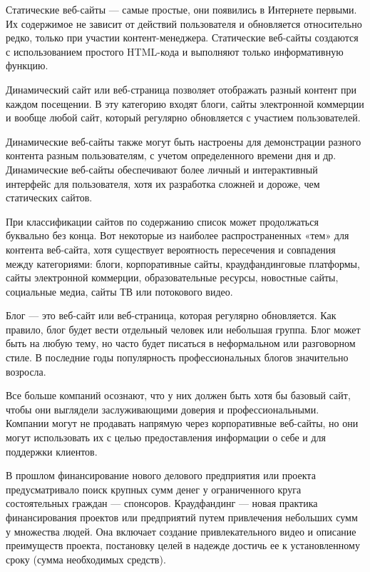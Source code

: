 Статические веб-сайты — самые простые, они появились в Интернете первыми.
Их содержимое не зависит от действий пользователя и обновляется относительно редко, только при участии контент-менеджера.
Статические веб-сайты создаются с использованием простого HTML-кода и выполняют только информативную функцию.

Динамический сайт или веб-страница позволяет отображать разный контент при каждом посещении.
В эту категорию входят блоги, сайты электронной коммерции и вообще любой сайт, который регулярно обновляется с участием пользователей.

Динамические веб-сайты также могут быть настроены для демонстрации разного контента разным пользователям, с учетом определенного времени дня и др.
Динамические веб-сайты обеспечивают более личный и интерактивный интерфейс для пользователя, хотя их разработка сложней и дороже, чем статических сайтов.


При классификации сайтов по содержанию список может продолжаться буквально без конца.
Вот некоторые из наиболее распространенных «тем» для контента веб-сайта, хотя существует вероятность пересечения и совпадения между категориями: блоги, корпоративные сайты, краудфандинговые платформы, сайты электронной коммерции, образовательные ресурсы, новостные сайты, социальные медиа, сайты ТВ или потокового видео.

Блог — это веб-сайт или веб-страница, которая регулярно обновляется.
Как правило, блог будет вести отдельный человек или небольшая группа.
Блог может быть на любую тему, но часто будет писаться в неформальном или разговорном стиле.
В последние годы популярность профессиональных блогов значительно возросла.

Все больше компаний осознают, что у них должен быть хотя бы базовый сайт, чтобы они выглядели заслуживающими доверия и профессиональными.
Компании могут не продавать напрямую через корпоративные веб-сайты, но они могут использовать их с целью предоставления информации о себе и для поддержки клиентов.

В прошлом финансирование нового делового предприятия или проекта предусматривало поиск крупных сумм денег у ограниченного круга состоятельных граждан — спонсоров.
Краудфандинг — новая практика финансирования проектов или предприятий путем привлечения небольших сумм у множества людей.
Она включает создание привлекательного видео и описание преимуществ проекта, постановку целей в надежде достичь ее к установленному сроку (сумма необходимых средств).

